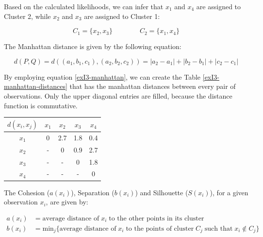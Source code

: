 \documentclass[12pt]{article}
\begin{document}
\begin{enumerate}[leftmargin=\labelsep]
          Based on the calculated likelihoods, we can infer that $x_1$ and $x_4$ are assigned to Cluster 2, while $x_2$ and $x_3$ are assigned to Cluster 1:

          \vskip -0.3cm
          \begin{equation*}
              C_1 = \{x_2, x_3\} \qquad\qquad C_2 = \{x_1, x_4\}
          \end{equation*}

          The Manhattan distance is given by the following equation:

          \begin{equation}\label{exI3-manhattan}
              d(P, Q) = d((a_1, b_1, c_1), (a_2, b_2, c_2))= |a_2 - a_1| + |b_2 - b_1| + |c_2 - c_1|
          \end{equation}

          By employing equation \eqref{exI3-manhattan}, we can create the Table \ref{exI3-manhattan-distances} that has the manhattan
          distances between every pair of observations. Only the upper diagonal entries are filled, because the distance function is commutative.

          \begin{center}
              \captionsetup{type=table}
              \begin{tabular}{c|cccc}
                  $d(x_i, x_j)$ & $x_1$ & $x_2$ & $x_3$ & $x_4$ \\
                  \hline
                  $x_1$ & 0 & 2.7 & 1.8 & 0.4 \\
                  $x_2$ & - & 0   & 0.9 & 2.7 \\
                  $x_3$ & - & -   & 0   & 1.8 \\
                  $x_4$ & - & -   & -   & 0
              \end{tabular}
              \label{exI3-manhattan-distances}
          \end{center}

          The Cohesion ($a(x_i)$), Separation ($b(x_i)$) and Silhouette ($S(x_i)$), for a given observation $x_i$, are given by:

          \vskip -0.3cm
          \begin{equation*}
          \begin{aligned}
              a(x_i) & = \text{average distance of} \; x_i \; \text{to the other points in its cluster} \\
              b(x_i) & = \text{min}_j\{\text{average distance of} \; x_i \; \text{to the points of cluster} \; C_j \; \text{such that} \; x_i \notin C_j\}
          \end{aligned}
          \end{equation*}


\end{enumerate}
\end{document}

